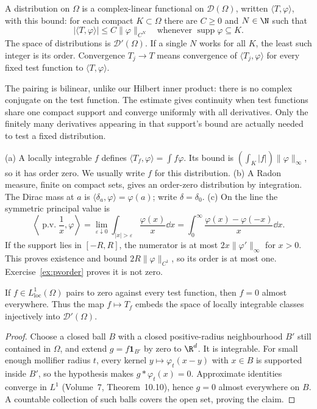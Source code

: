 \begin{definition}
A distribution on $\Omega$ is a complex-linear functional on $\mathcal D(\Omega)$, written $\langle T,\varphi\rangle$, with this bound: for each compact $K\subset\Omega$ there are $C\ge0$ and $N\in\N$ such that
\[
|\langle T,\varphi\rangle|\le C\|\varphi\|_{C^N}
\quad\text{whenever }\operatorname{supp}\varphi\subseteq K.
\]
The space of distributions is $\mathcal D'(\Omega)$. If a single $N$ works for all $K$, the least such integer is its order. Convergence $T_j\to T$ means convergence of $\langle T_j,\varphi\rangle$ for every fixed test function to $\langle T,\varphi\rangle$.
\end{definition}

The pairing is bilinear, unlike our Hilbert inner product: there is no complex conjugate on the test function. The estimate gives continuity when test functions share one compact support and converge uniformly with all derivatives. Only the finitely many derivatives appearing in that support's bound are actually needed to test a fixed distribution.

\begin{example}\label{ex:distexamples}
(a) A locally integrable $f$ defines $\langle T_f,\varphi\rangle=\int f\varphi$. Its bound is $(\int_K|f|)\|\varphi\|_\infty$, so it has order zero. We usually write $f$ for this distribution.
(b) A Radon measure, finite on compact sets, gives an order-zero distribution by integration. The Dirac mass at $a$ is $\langle\delta_a,\varphi\rangle=\varphi(a)$; write $\delta=\delta_0$.
(c) On the line the symmetric principal value is
\[
\left\langle\operatorname{p.v.}\frac1x,\varphi\right\rangle
=\lim_{\varepsilon\downarrow0}\int_{|x|>\varepsilon}\frac{\varphi(x)}x\dd x
=\int_0^\infty\frac{\varphi(x)-\varphi(-x)}x\dd x.
\]
If the support lies in $[-R,R]$, the numerator is at most $2x\|\varphi'\|_\infty$ for $x>0$. This proves existence and bound $2R\|\varphi\|_{C^1}$, so its order is at most one. Exercise~\ref{ex:pvorder} proves it is not zero.
\end{example}

\begin{proposition}\label{prop:lloc}
If $f\in L^1_{\mathrm{loc}}(\Omega)$ pairs to zero against every test function, then $f=0$ almost everywhere. Thus the map $f\mapsto T_f$ embeds the space of locally integrable classes injectively into $\mathcal D'(\Omega)$.
\end{proposition}
\begin{proof}
Choose a closed ball $B$ with a closed positive-radius neighbourhood $B'$ still contained in $\Omega$, and extend $g=f\mathbf1_{B'}$ by zero to $\R^d$. It is integrable. For small enough mollifier radius $t$, every kernel $y\mapsto\varphi_t(x-y)$ with $x\in B$ is supported inside $B'$, so the hypothesis makes $g*\varphi_t(x)=0$. Approximate identities converge in $L^1$ (Volume~7, Theorem~10.10), hence $g=0$ almost everywhere on $B$. A countable collection of such balls covers the open set, proving the claim.
\end{proof}

